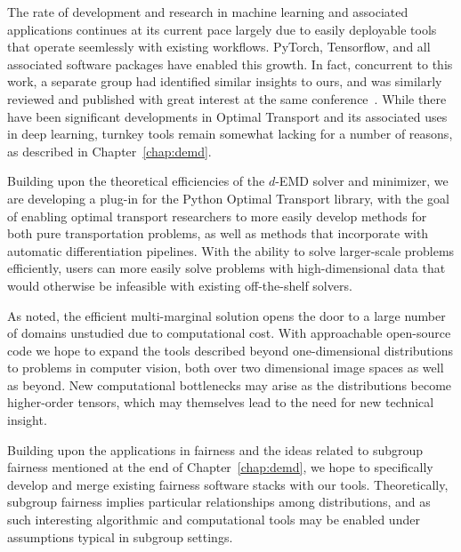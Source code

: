 The rate of development and research in machine learning and associated applications
continues at its current pace
largely due to 
easily deployable tools that
operate seemlessly with existing workflows.
PyTorch, Tensorflow, and all associated software
packages have enabled this growth.
In fact,
concurrent to this work,
a separate group had identified 
similar insights to ours,
and was similarly reviewed and published
with great interest at the same conference~\citep{just2023lava}.
While there have been significant 
developments in Optimal Transport
and its associated 
uses in deep learning,
turnkey tools remain somewhat lacking
for a number of reasons,
as described in Chapter~\ref{chap:demd}.

Building upon the theoretical
efficiencies of the $d$-EMD solver
and minimizer,
we are developing
a plug-in for the Python Optimal Transport library,
with the goal of enabling
optimal transport researchers to 
more easily develop methods
for both pure transportation problems,
as well as methods that incorporate
with automatic differentiation pipelines.
With the ability to solve larger-scale 
problems efficiently,
users can more easily solve 
problems with high-dimensional data
that would otherwise be infeasible
with existing off-the-shelf solvers.

As noted,
the efficient multi-marginal solution
opens the door to a large number 
of domains unstudied due to computational cost.
With approachable open-source code
we hope to expand the tools described
beyond one-dimensional distributions
to problems in computer vision,
both over two dimensional image spaces
as well as beyond.
New computational bottlenecks may arise
as the distributions become
higher-order tensors, which 
may themselves lead to 
the need for new technical
insight.

Building upon the applications in fairness
and the ideas related to subgroup fairness
mentioned at the end of Chapter~\ref{chap:demd},
we hope to specifically
develop and merge existing fairness
software stacks with our tools.
Theoretically, subgroup fairness implies
particular relationships among distributions,
and as such interesting algorithmic
and computational tools may be enabled
under assumptions typical in subgroup settings.

